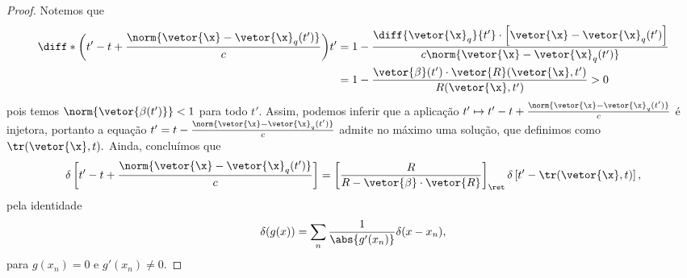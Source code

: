 \begin{proof}
   Notemos que 
   \begin{align*}
      \diff*{\left(t' - t + \frac{\norm{\vetor{\x} - \vetor{\x}_q(t')}}{c}\right)}{t'} 
      &= 1 - \frac{\diff{\vetor{\x}_q}{t'}\cdot\left[\vetor{\x} - \vetor{\x}_q(t')\right]}{c \norm{\vetor{\x} - \vetor{\x}_q(t')}}\\
      &= 1 - \frac{\vetor{\beta}(t') \cdot \vetor{R}(\vetor{\x}, t')}{R(\vetor{\x}, t')} > 0
   \end{align*}
   pois temos \(\norm{\vetor{\beta(t')}} < 1\) para todo \(t'.\) Assim, podemos inferir que a aplicação \(t' \mapsto t' - t + \frac{\norm{\vetor{\x} - \vetor{\x}_q(t')}}{c}\) é injetora, portanto a equação \(t' = t - \frac{\norm{\vetor{\x} - \vetor{\x}_q(t')}}{c}\) admite no máximo uma solução, que definimos como \(\tr(\vetor{\x}, t).\) Ainda, concluímos que
   \begin{equation*}
      \delta\left[t' - t + \frac{\norm{\vetor{\x} - \vetor{\x}_q(t')}}{c}\right] = \left[\frac{R}{R - \vetor{\beta} \cdot \vetor{R}}\right]_{\ret} \delta\left[t' - \tr(\vetor{\x}, t)\right],
   \end{equation*}
   pela identidade
   \begin{equation*}
      \delta(g(x)) = \sum_n \frac{1}{\abs{g'(x_n)}} \delta(x - x_n),
   \end{equation*}
   para \(g(x_n) = 0\) e \(g'(x_n) \neq 0.\)


\end{proof}
